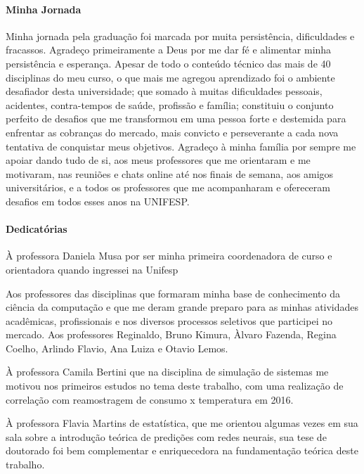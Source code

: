 \documentclass[	12pt, Times, openright, twoside, a4paper, english, brazil]{abntex2}
\begin{document}
    \begin{agradecimentos}
        \paragraph{Minha Jornada}
        Minha jornada pela graduação foi marcada por muita persistência, dificuldades e fracassos. Agradeço primeiramente a Deus por me dar fé e alimentar minha persistência e esperança. Apesar de todo o conteúdo técnico das mais de 40 disciplinas do meu curso, o que mais me agregou aprendizado foi o ambiente desafiador desta universidade; que somado à muitas dificuldades pessoais, acidentes, contra-tempos de saúde, profissão e família; constituiu o conjunto perfeito de desafios que me transformou em uma pessoa forte e destemida para enfrentar as cobranças do mercado, mais convicto e perseverante a cada nova tentativa de conquistar meus objetivos. Agradeço à minha família por sempre me apoiar dando tudo de si, aos meus professores que me orientaram e me motivaram, nas reuniões e chats online até nos finais de semana, aos amigos universitários, e a todos os professores que me acompanharam e ofereceram desafios em todos esses anos na UNIFESP.
        \paragraph{Dedicatórias}
                
                À professora Daniela Musa por ser minha primeira coordenadora de curso e orientadora quando ingressei na Unifesp\newline
                
                Aos professores das disciplinas que formaram minha base de conhecimento da ciência da computação e que me deram grande preparo para as minhas atividades acadêmicas, profissionais e nos diversos processos seletivos que participei no mercado. Aos professores Reginaldo, Bruno Kimura, Àlvaro Fazenda, Regina Coelho, Arlindo Flavio, Ana Luiza e Otavio Lemos.\newline
                
                À professora Camila Bertini  que na disciplina de simulação de sistemas me motivou nos primeiros estudos no tema deste trabalho, com uma realização de correlação com reamostragem de consumo x temperatura em 2016.\newline
                
                À professora Flavia Martins de estatística, que me orientou algumas vezes em sua sala sobre a introdução teórica de predições com redes neurais, sua tese de doutorado foi bem complementar e enriquecedora na fundamentação teórica deste trabalho.\newline
                

\end{agradecimentos}
\end{document}

